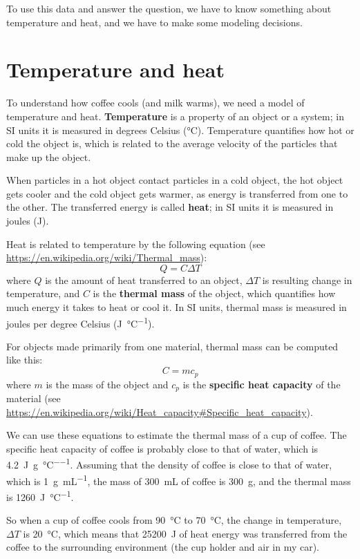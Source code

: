 \documentclass[12pt]{book}
\theoremstyle{exercise}
\begin{document}
To use this data and answer the question, we have to know something about temperature and heat, and we have to make some modeling decisions.


\section{Temperature and heat}

To understand how coffee cools (and milk warms), we need a model of temperature and heat.  {\bf Temperature} is a property of an object or a system; in SI units it is measured in degrees Celsius (\si{\celsius}).  Temperature quantifies how hot or cold the object is, which is related to the average velocity of the particles that make up the object.

When particles in a hot object contact particles in a cold object, the hot object gets cooler and the cold object gets warmer, as energy is transferred from one to the other.  The transferred energy is called {\bf heat}; in SI units it is measured in joules (\si{\joule}).

Heat is related to temperature by the following equation (see \url{https://en.wikipedia.org/wiki/Thermal_mass}):
%
\[ Q = C \Delta T \]
%
where $Q$ is the amount of heat transferred to an object, $\Delta T$ is resulting change in temperature, and $C$ is the {\bf thermal mass} of the object, which quantifies how much energy it takes to heat or cool it.  In SI units, thermal mass is measured in joules per degree Celsius (\si{\joule\per\celsius}).

For objects made primarily from one material, thermal mass can be computed like this:
%
\[ C = m c_p \]
%
where $m$ is the mass of the object and $c_p$ is the {\bf specific heat capacity} of the material (see \url{https://en.wikipedia.org/wiki/Heat_capacity#Specific_heat_capacity}).

We can use these equations to estimate the thermal mass of a cup of coffee.  The specific heat capacity of coffee is probably close to that of water, which is \SI{4.2}{\joule\per\gram\per\celsius}.  Assuming that the density of coffee is close to that of water, which is \SI{1}{\gram\per\milli\liter}, the mass of \SI{300}{\milli\liter} of coffee is \SI{300}{\gram}, and the thermal mass is \SI{1260}{\joule\per\celsius}.

So when a cup of coffee cools from \SI{90}{\celsius} to \SI{70}{\celsius}, the change in temperature, $\Delta T$ is \SI{20}{\celsius}, which means that \SI{25200}{\joule} of heat energy was transferred from the coffee to the surrounding environment (the cup holder and air in my car).
\end{document}
